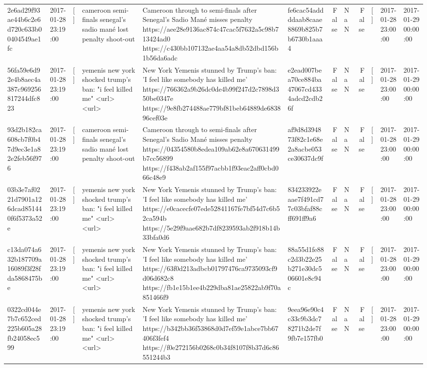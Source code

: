 \begin{tabular}{llllllrlrlll}
2e6ad29f93ae44b6c2e6d720c633b00404549ae1fc & 2017-01-28 23:19:00 & [] & cameroon semi-finals senegal's sadio mané lost penalty shoot-out & Cameroon through to semi-finals after Senegal’s Sadio Mané misses penalty https://aee28e9136ac874c47cac5f7632a5c98b713424ad0 https://c430bb107132ae4aa54a8db52dbd156b1b56da6adc & fe6cac54addddaab8caae8869b825b7b6730b1aaa4 & False & NaN & False & [] & 2017-01-28 23:00:00 & 2017-01-29 00:00:00 \\
56fa59e6d92e4b8aec4a387c969256817244dfc823 & 2017-01-28 23:19:00 & [] & yemenis new york shocked trump's ban: "i feel killed me" <url> <url> & New York Yemenis stunned by Trump's ban: 'I feel like somebody has killed me' https://766362a9b26dc0de4b99f247d2c7898d350be0347e https://9e8fb274488ae779bf81beb64889de683896cef03e & e2ead007bea70ce884ba47067cd4334adcd2cdb26f & False & NaN & False & [] & 2017-01-28 23:00:00 & 2017-01-29 00:00:00 \\
93d2b182ca608cb7f0b47d9ec3e1a82e2feb56f976 & 2017-01-28 23:19:00 & [] & cameroon semi-finals senegal's sadio mané lost penalty shoot-out & Cameroon through to semi-finals after Senegal’s Sadio Mané misses penalty https://04354580b8edea109ab62e8a670631499b7cc56899 https://f438ab2af155f97acbb1f93eac2aff0cbd066c48e9 & af9d8d394873f82c1e68e2a8acbe053ce30637dc9f & False & NaN & False & [] & 2017-01-28 23:00:00 & 2017-01-29 00:00:00 \\
03b3e7af0221d7901a126dcad851440f6f5373a52e & 2017-01-28 23:19:00 & [] & yemenis new york shocked trump's ban: "i feel killed me" <url> <url> & New York Yemenis stunned by Trump's ban: 'I feel like somebody has killed me' https://e0cacecfe07ede52841167fe7bf54d7c6b52ca594b https://5e29f9aae682b7df8239593ab2f918b14b33bfa0d6 & 834233922eaae7f491cd77c03bfaf88cff691ff9a6 & False & NaN & False & [] & 2017-01-28 23:00:00 & 2017-01-29 00:00:00 \\
c13da074a632b187709a16089f3f28fda5868475be & 2017-01-28 23:19:00 & [] & yemenis new york shocked trump's ban: "i feel killed me" <url> <url> & New York Yemenis stunned by Trump's ban: 'I feel like somebody has killed me' https://63f0d213adbcb01797476ca9735093cf9d06d682c8 https://fb1e15b1ee4b229dba81ae25822ab9f70a851466f9 & 88a55d1fe88c2d3b22e25b271e30dc506601e8c94c & False & NaN & False & [] & 2017-01-28 23:00:00 & 2017-01-29 00:00:00 \\
0322cd044e7b7c652ced225b605a28fb24058ec599 & 2017-01-28 23:19:00 & [] & yemenis new york shocked trump's ban: "i feel killed me" <url> <url> & New York Yemenis stunned by Trump's ban: 'I feel like somebody has killed me' https://b342bb36f53868d0d7ef59e1abce7bb67406f3fef4 https://f0e272156b0268c0b34f8107f8b37d6c86551244b3 & 9eea96e90c4c33c9b3dc78271b2de7f9fb7e157fb0 & False & NaN & False & [] & 2017-01-28 23:00:00 & 2017-01-29 00:00:00 \\

\end{tabular}
